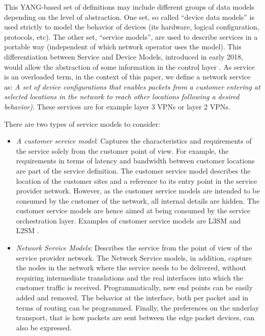 \documentclass[a4paper,fleqn]{cas-dc}
\begin{document}
This YANG-based set of definitions may include different groups of data models depending on the level of abstraction. One set, so called “device data models” is used strictly to model the behavior of devices (its hardware, logical configuration, protocols, etc). The other set, “service models”, are used to describe services in a portable way (independent of which network operator uses the model). This differentiation between Service and Device Models, introduced in early 2018, would allow the abstraction of some information in the control layer \cite{wu2017service}. As service is an overloaded term, in the context of this paper, we define a network service as: \textit{A set of device configurations that enables packets from a customer entering at selected locations in the network to reach other locations following a desired behavior)}. These services are for example layer 3 VPNs or layer 2 VPNs. 

There are two types of service models to consider:
\begin{itemize}
\item 	\textit{A customer service model}: Captures the characteristics and requirements of the service solely from the customer point of view. For example, the requirements in terms of latency and bandwidth between customer locations are part of the service definition. The customer service model describes the location of the customer sites and a reference to its entry point in the service provider network. However, as the customer service models are intended to be consumed by the customer of the network, all internal details are hidden. The customer service models are hence aimed at being consumed by the service orchestration layer. Examples of customer service models are L3SM \cite{rosen2006rfc} and L2SM \cite{wen2018yang}.

\item 	\textit{Network Service Models}:  Describes the service from the point of view of the service provider network. The Network Service models, in addition, capture the nodes in the network where the service needs to be delivered, without requiring intermediate translations and the real interfaces into which the customer traffic is received. Programmatically, new end points can be easily added and removed. The behavior at the interface, both per packet and in terms of routing can be programmed. Finally, the preferences on the underlay transport, that is how packets are sent between the edge packet devices, can also be expressed.
\end{itemize}
\end{document}

